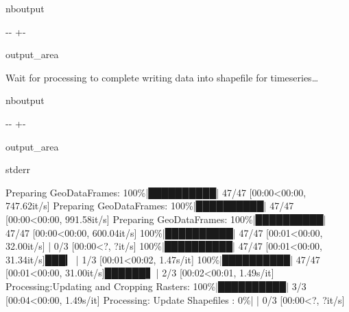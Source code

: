 \documentclass[letterpaper,10pt,english]{sphinxmanual}
\begin{document}
\begin{sphinxuseclass}{nboutput}
{

\kern-\sphinxverbatimsmallskipamount\kern-\baselineskip
\kern+\FrameHeightAdjust\kern-\fboxrule
\vspace{\nbsphinxcodecellspacing}

\begin{sphinxuseclass}{output_area}
\begin{sphinxuseclass}{}


\begin{sphinxVerbatim}[commandchars=\\\{\}]
Wait for processing to complete writing data into shapefile for timeseries{\ldots}
\end{sphinxVerbatim}



\end{sphinxuseclass}
\end{sphinxuseclass}
}

\end{sphinxuseclass}
\begin{sphinxuseclass}{nboutput}
{

\kern-\sphinxverbatimsmallskipamount\kern-\baselineskip
\kern+\FrameHeightAdjust\kern-\fboxrule
\vspace{\nbsphinxcodecellspacing}

\begin{sphinxuseclass}{output_area}
\begin{sphinxuseclass}{stderr}


\begin{sphinxVerbatim}[commandchars=\\\{\}]
Preparing GeoDataFrames: 100\%|██████████| 47/47 [00:00<00:00, 747.62it/s]
Preparing GeoDataFrames: 100\%|██████████| 47/47 [00:00<00:00, 991.58it/s]
Preparing GeoDataFrames: 100\%|██████████| 47/47 [00:00<00:00, 600.04it/s]
100\%|██████████| 47/47 [00:01<00:00, 32.00it/s]          | 0/3 [00:00<?, ?it/s]
100\%|██████████| 47/47 [00:01<00:00, 31.34it/s]███▎      | 1/3 [00:01<00:02,  1.47s/it]
100\%|██████████| 47/47 [00:01<00:00, 31.00it/s]██████▋   | 2/3 [00:02<00:01,  1.49s/it]
Processing:Updating and Cropping Rasters: 100\%|██████████| 3/3 [00:04<00:00,  1.49s/it]
Processing: Update Shapefiles :   0\%|          | 0/3 [00:00<?, ?it/s]
\end{sphinxVerbatim}



\end{sphinxuseclass}
\end{sphinxuseclass}
}

\end{sphinxuseclass}
\end{document}
